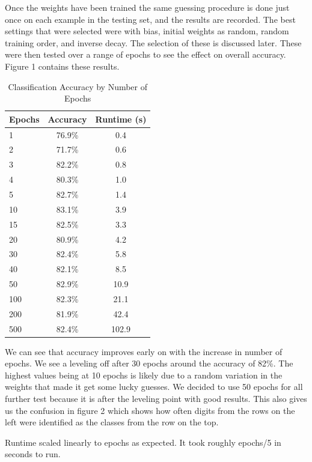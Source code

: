 \documentclass{article}[12pt]
\begin{document}
   Once the weights have been trained the same guessing procedure is done just once on each example in the testing set, and the results are recorded. The best settings that were selected were with bias, initial weights as random, random training order, and inverse decay. The selection of these is discussed later. These were then tested over a range of epochs to see the effect on overall accuracy. Figure 1 contains these results.
   
   \begin{table}[ht]
   	\centering
   	\begin{tabular}{l | c | c}
   		\hline
   		Epochs  & Accuracy & Runtime (s)\\
   		\hline \hline \hline
   		1 & 76.9\% & 0.4\\
   		2 & 71.7\% &0.6\\
   		3 & 82.2\% &0.8\\
   		4 & 80.3\% &1.0\\
   		5 & 82.7\% &1.4\\
   		10 & 83.1\% &3.9\\
   		15 & 82.5\% &3.3\\
   		20 & 80.9\% &4.2\\
   		30 & 82.4\% &5.8\\
   		40 & 82.1\% &8.5\\
   		50 & 82.9\% &10.9\\
   		100 & 82.3\% &21.1\\
   		200 & 81.9\% &42.4\\
   		500 & 82.4\% &102.9\\
   		\hline
   	\end{tabular}
   	\caption{Classification Accuracy by Number of Epochs} \label{tab:digacc}
   \end{table}
   
   We can see that accuracy improves early on with the increase in number of epochs. We see a leveling off after 30 epochs around the accuracy of 82\%. The highest values being at 10 epochs is likely due to a random variation in the weights that made it get some lucky guesses. We decided to use 50 epochs for all further test because it is after the leveling point with good results. This also gives us the confusion  in figure 2 which shows how often digits from the rows on the left were identified as the classes from the row on the top.
   
   Runtime scaled linearly to epochs as expected. It took roughly epochs/5 in seconds to run. 
   
\end{document}
